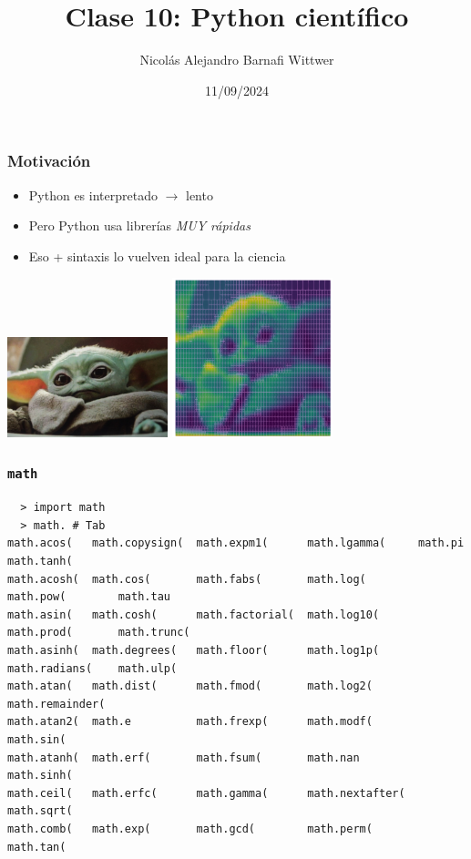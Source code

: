 \documentclass[14pt,aspectratio=169,xcolor=dvipsnames]{beamer}
\title[short title]{Clase 10: Python científico}
\subtitle{}
\author[NA Barnafi] {Nicolás Alejandro Barnafi Wittwer}
\institute[UC|CMM] 
{
    Pontificia Universidad Católica de Chile \\
    Centro de Modelamiento Matemático
}
\date{11/09/2024}
\begin{document}
\begin{frame}
    \maketitle
\end{frame}
\begin{frame}[fragile]\frametitle{Motivación}
    \begin{itemize}
        \item Python es interpretado $\to$ lento
        \item Pero Python usa librerías \emph{MUY rápidas}
        \item Eso + sintaxis lo vuelven ideal para la ciencia
    \end{itemize}
    \begin{center}
    \includegraphics[width=0.35\textwidth]{../images/baby-yoda-T.jpg} \hspace{1cm}\includegraphics[width=0.35\textwidth]{../images/baby-yoda-mesh.png}
    \end{center}
\end{frame}
\begin{frame}[fragile]\frametitle{\texttt{math}}
    \begin{verbatim}
  > import math
  > math. # Tab
math.acos(   math.copysign(  math.expm1(      math.lgamma(     math.pi          math.tanh(
math.acosh(  math.cos(       math.fabs(       math.log(        math.pow(        math.tau
math.asin(   math.cosh(      math.factorial(  math.log10(      math.prod(       math.trunc(
math.asinh(  math.degrees(   math.floor(      math.log1p(      math.radians(    math.ulp(
math.atan(   math.dist(      math.fmod(       math.log2(       math.remainder(  
math.atan2(  math.e          math.frexp(      math.modf(       math.sin(        
math.atanh(  math.erf(       math.fsum(       math.nan         math.sinh(       
math.ceil(   math.erfc(      math.gamma(      math.nextafter(  math.sqrt(       
math.comb(   math.exp(       math.gcd(        math.perm(       math.tan(  
    \end{verbatim}
    
\end{frame}
\end{document}
